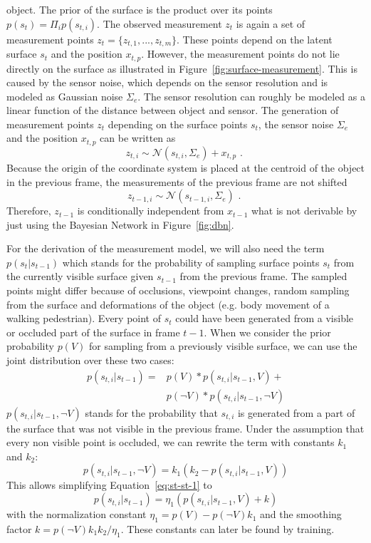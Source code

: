\documentclass[twoside,a4paper,article]{combine}
\begin{document}
object. The prior of the surface is the product over its points
$p(s_{t})=\Pi_i p(s_{t,i})$.
The observed measurement $z_t$ is again a set of measurement points
$z_t=\{z_{t,1}, ..., z_{t,m}\}$. These points depend on the latent
surface $s_t$ and the position $x_{t,p}$. However, the measurement
points do not lie directly on the surface as illustrated in
Figure~\ref{fig:surface-measurement}. This is caused by the sensor
noise, which depends on the sensor resolution and is modeled as
Gaussian noise $\Sigma_e$. The sensor resolution can roughly be modeled as a
linear function of the distance between object and sensor. The
generation of measurement points $z_t$ depending on the surface points
$s_t$, the sensor noise $\Sigma_e$ and the position $x_{t,p}$ can be written as
\begin{equation}
\label{eq:gaus-zt}
z_{t,i} \sim \mathcal{N}(s_{t,i},\Sigma_e) + x_{t,p} \mbox{ . }
\end{equation}
Because the origin of the coordinate system is placed at the centroid
of the object in the previous frame, the measurements of the previous
frame are not shifted
\begin{equation}
\label{eq:ind-centroid}
z_{t-1,i} \sim \mathcal{N}(s_{t-1,i},\Sigma_e) \mbox{ . }
\end{equation}
Therefore, $z_{t-1}$ is conditionally independent from $x_{t-1}$ what
is not derivable by just using the Bayesian Network in
Figure~\ref{fig:dbn}.

For the derivation of the measurement model, we will also need the
term $p(s_t|s_{t-1})$ which stands for the probability of sampling
surface points $s_t$ from the currently visible surface given
$s_{t-1}$ from the previous frame. The sampled points might differ
because of occlusions, viewpoint changes, random sampling from the
surface and deformations of the object (e.g. body movement of a
walking pedestrian). Every point of $s_t$ could have been generated
from a visible or occluded part of the surface in frame $t-1$. When we
consider the prior probability $p(V)$ for sampling from a previously
visible surface, we can use the joint distribution over these two
cases:
\begin{align}
\label{eq:st-st-1}
p(s_{t,i}|s_{t-1})=&p(V)*p(s_{t,i}|s_{t-1},V) + \nonumber\\
&p(\neg V)*p(s_{t,i}|s_{t-1},\neg V)
\end{align}
$p(s_{t,i}|s_{t-1},\neg V)$ stands for the probability that $s_{t,i}$
is generated from a part of the surface that was not visible in the
previous frame. Under the assumption that every non visible point is
occluded, we can rewrite the term with constants $k_1$ and $k_2$:
\begin{equation}
p(s_{t,i}|s_{t-1},\neg V) = k_1 (k_2 - p(s_{t,i}|s_{t-1},V))
\end{equation}
This allows simplifying Equation~\ref{eq:st-st-1} to
\begin{equation}
\label{eq:prob-surf}
p(s_{t,i}|s_{t-1})=\eta_1 (p(s_{t,i}|s_{t-1},V) + k)
\end{equation}
with the normalization constant $\eta_1=p(V)-p(\neg V) k_1$ and the
smoothing factor $k=p(\neg V)k_1k_2/\eta_1$.
These constants can later be found by training.
\end{document}
